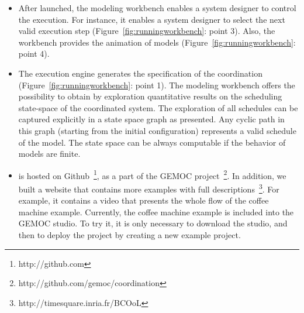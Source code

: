 \begin{itemize}
	\item After launched, the modeling workbench enables a system designer to control the execution. For instance, it enables a system designer to select the next valid execution step (Figure~\ref{fig:runningworkbench}: point 3). Also, the workbench provides the animation of models (Figure~\ref{fig:runningworkbench}: point 4).  
	
	\item  The execution engine generates the \ccsl specification of the coordination (Figure~\ref{fig:runningworkbench}: point 1). The modeling workbench offers the possibility to obtain by exploration quantitative results on the scheduling state-space of the coordinated system. The exploration of all schedules can be captured explicitly in a state space graph as presented. Any cyclic path in this graph (starting from the initial configuration) represents a valid schedule of the model. The state space can be always computable if the behavior of models are finite.
	
	
	\item \bcool is hosted on Github~\footnote{http://github.com}, as a part of the GEMOC project~\footnote{http://github.com/gemoc/coordination}. In addition, we built a website that contains more examples with full descriptions~\footnote{http://timesquare.inria.fr/BCOoL}. For example, it contains a video that presents the whole flow of the coffee machine example. Currently, the coffee machine example is included into the GEMOC studio. To try it, it is only necessary to download the studio, and then to deploy the project by creating a new example project. 

\end{itemize}


	
